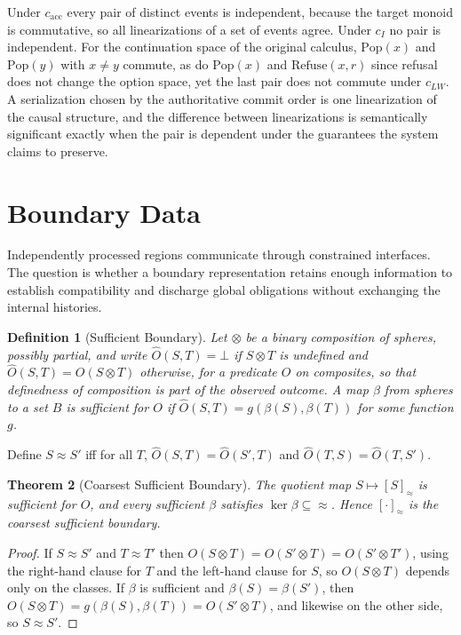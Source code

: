 \documentclass[12pt,oneside,openany]{book}
\theoremstyle{spherepop}
\newtheorem{definition}{Definition}[chapter]
\newtheorem{theorem}[definition]{Theorem}
\theoremstyle{remarkstyle}
\newcommand{\Pop}{\mathrm{Pop}}
\newcommand{\Rfuse}{\mathrm{Refuse}}
\begin{document}
Under $c_{\mathrm{acc}}$ every pair of distinct events is independent, because the target monoid is commutative, so all linearizations of a set of events agree. Under $c_I$ no pair is independent. For the continuation space of the original calculus, $\Pop(x)$ and $\Pop(y)$ with $x\ne y$ commute, as do $\Pop(x)$ and $\Rfuse(x,r)$ since refusal does not change the option space, yet the last pair does not commute under $c_{LW}$. A serialization chosen by the authoritative commit order is one linearization of the causal structure, and the difference between linearizations is semantically significant exactly when the pair is dependent under the guarantees the system claims to preserve.

\section{Boundary Data}

Independently processed regions communicate through constrained interfaces. The question is whether a boundary representation retains enough information to establish compatibility and discharge global obligations without exchanging the internal histories.

\begin{definition}[Sufficient Boundary]
Let $\otimes$ be a binary composition of spheres, possibly partial, and write $\widehat O(S,T)=\bot$ if $S\otimes T$ is undefined and $\widehat O(S,T)=O(S\otimes T)$ otherwise, for a predicate $O$ on composites, so that definedness of composition is part of the observed outcome. A map $\beta$ from spheres to a set $B$ is \emph{sufficient} for $O$ if $\widehat O(S,T)=g(\beta(S),\beta(T))$ for some function $g$.
\end{definition}

Define $S\approx S'$ iff for all $T$, $\widehat O(S,T)=\widehat O(S',T)$ and $\widehat O(T,S)=\widehat O(T,S')$.

\begin{theorem}[Coarsest Sufficient Boundary]
\label{thm:boundary}
The quotient map $S\mapsto[S]_\approx$ is sufficient for $O$, and every sufficient $\beta$ satisfies $\ker\beta\subseteq{\approx}$. Hence $[\cdot]_\approx$ is the coarsest sufficient boundary.
\end{theorem}

\begin{proof}
If $S\approx S'$ and $T\approx T'$ then $O(S\otimes T)=O(S'\otimes T)=O(S'\otimes T')$, using the right-hand clause for $T$ and the left-hand clause for $S$, so $O(S\otimes T)$ depends only on the classes. If $\beta$ is sufficient and $\beta(S)=\beta(S')$, then $O(S\otimes T)=g(\beta(S),\beta(T))=O(S'\otimes T)$, and likewise on the other side, so $S\approx S'$.
\end{proof}
\end{document}
